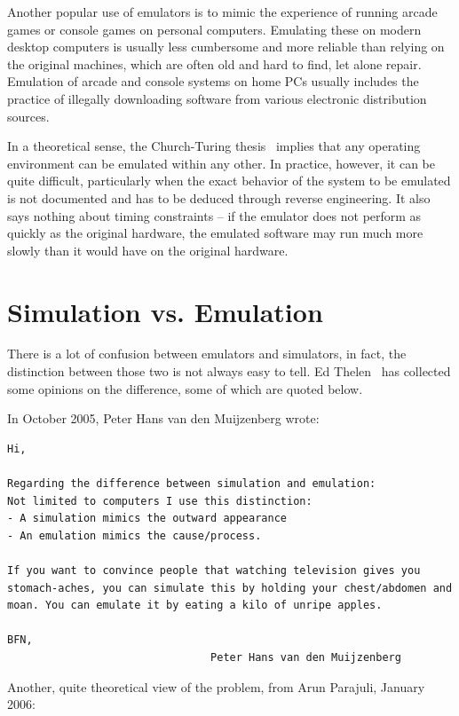 Another  popular use of emulators is to mimic the experience of running arcade
games or console games on personal computers. Emulating these on modern desktop
computers is usually less cumbersome and more reliable than relying on the
original machines, which are often old and hard to find, let alone repair.
Emulation of arcade and console systems on home PCs usually includes the
practice of illegally downloading software from various electronic distribution
sources.

In a theoretical sense, the Church-Turing thesis~\cite{church-turing}
implies that any operating environment can be emulated within any other. In
practice, however, it can be quite difficult, particularly when the exact
behavior of the system to be emulated is not documented and has to be deduced
through reverse engineering. It also says nothing about timing constraints --
if the emulator does not perform as quickly as the original hardware, the
emulated software may run much more slowly than it would have on the original
hardware.


\section{Simulation vs. Emulation}

There is a lot of confusion between emulators and simulators, in fact, the
distinction between those two is not always easy to tell. Ed
Thelen~\cite{emu-vs-simu} has collected some opinions on the difference, some of
which are quoted below.

In October 2005, Peter Hans van den Muijzenberg wrote:

\begin{verbatim}
Hi,

Regarding the difference between simulation and emulation:
Not limited to computers I use this distinction:
- A simulation mimics the outward appearance
- An emulation mimics the cause/process.

If you want to convince people that watching television gives you
stomach-aches, you can simulate this by holding your chest/abdomen and
moan. You can emulate it by eating a kilo of unripe apples.

BFN,
                                Peter Hans van den Muijzenberg
\end{verbatim}

Another, quite theoretical view of the problem, from Arun Parajuli, January
2006:

